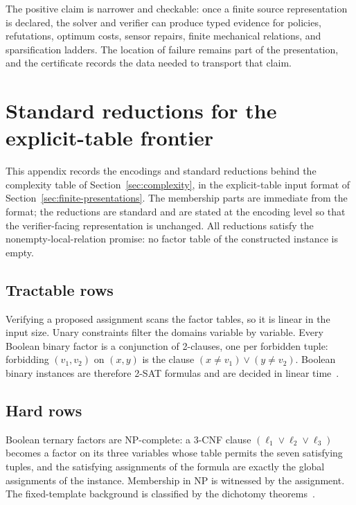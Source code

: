 \documentclass[11pt]{article}
\theoremstyle{plain}
\theoremstyle{definition}
\theoremstyle{remark}
\begin{document}
The positive claim is narrower and checkable: once a finite source
representation is declared, the solver and verifier can produce typed evidence
for policies, refutations, optimum costs, sensor repairs, finite mechanical
relations, and sparsification ladders.  The location of failure remains part of
the presentation, and the certificate records the data needed to transport that
claim.



\section{Standard reductions for the explicit-table frontier}
\label{app:reductions}

This appendix records the encodings and standard reductions behind the
complexity table of Section~\ref{sec:complexity}, in the explicit-table
input format of Section~\ref{sec:finite-presentations}.  The membership
parts are immediate from the format; the reductions are standard and are
stated at the encoding level so that the verifier-facing representation is
unchanged.  All reductions satisfy the nonempty-local-relation promise: no
factor table of the constructed instance is empty.

\subsection{Tractable rows}

Verifying a proposed assignment scans the factor tables, so it is linear in
the input size.  Unary constraints filter the domains variable by variable.
Every Boolean binary factor is a conjunction of 2-clauses, one per forbidden
tuple: forbidding \((v_1,v_2)\) on \((x,y)\) is the clause
\((x\ne v_1)\lor(y\ne v_2)\).  Boolean binary instances are therefore
2-SAT formulas and are decided in linear time~\cite{apt79}.

\subsection{Hard rows}

Boolean ternary factors are NP-complete: a 3-CNF clause
\((\ell_1\lor\ell_2\lor\ell_3)\) becomes a factor on its three variables
whose table permits the seven satisfying tuples, and the satisfying
assignments of the formula are exactly the global assignments of the
instance.  Membership in NP is witnessed by the assignment.  The
fixed-template background is classified by the dichotomy
theorems~\cite{schaefer78,zhuk17}.
\end{document}
